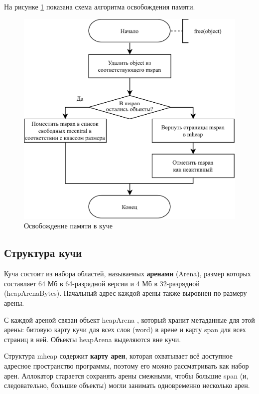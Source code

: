 На рисунке \ref{fig:golang-sweep} показана схема алгоритма освобождения памяти.

\begin{figure}[H]
	\centering
	\includegraphics[scale=0.175]{assets/golang-sweep.png}
	\caption{Освобождение памяти в куче}
	\label{fig:golang-sweep}
\end{figure}



\subsection{Структура кучи}

Куча состоит из набора областей, называемых \textbf{аренами} (Arena), размер которых составляет 64 Мб в 64-разрядной версии и 4 Мб в 32-разрядной (heapArenaBytes). Начальный адрес каждой арены также выровнен по размеру арены. \cite{golang_malloc}

С каждой ареной связан объект heapArena \cite{golang_mheap}, который хранит метаданные для этой арены: битовую карту кучи для всех слов (word) в арене и карту span для всех страниц в ней. Объекты heapArena выделяются вне кучи. \cite{golang_malloc}

Структура mheap содержит \textbf{карту арен}, которая охватывает всё доступное адресное пространство программы, поэтому его можно рассматривать как набор арен. Аллокатор старается сохранять арены смежными, чтобы большие span (и, следовательно, большие объекты) могли занимать одновременно несколько арен. \cite{golang_malloc}

